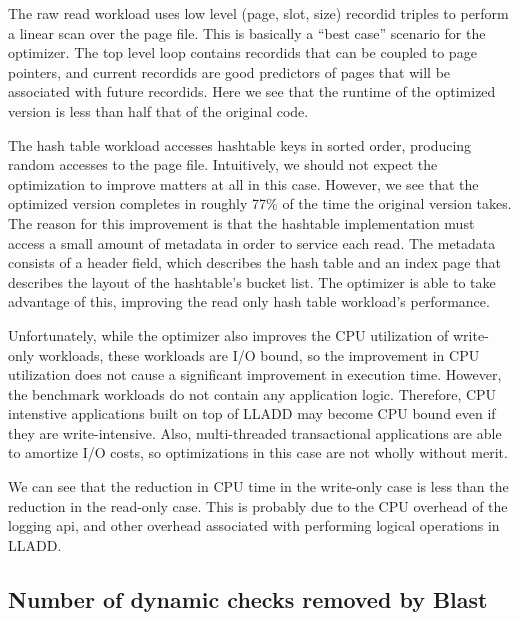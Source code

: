 \documentclass[10pt,letterpaper,twocolumn,english]{article}
\newcommand{\yad}{LLADD\xspace}
\begin{document}
The raw read workload uses low level (page, slot, size) recordid
triples to perform a linear scan over the page file.  This is
basically a ``best case'' scenario for the optimizer.  The top level
loop contains recordids that can be coupled to page pointers, and
current recordids are good predictors of pages that will be associated
with future recordids.  Here we see that the runtime of the optimized
version is less than half that of the original code.

The hash table workload accesses hashtable keys in sorted order,
producing random accesses to the page file.  Intuitively, we should not
expect the optimization to improve matters at all in this case.
However, we see that the optimized version completes in roughly 77\%
of the time the original version takes.  The reason for this
improvement is that the hashtable implementation must access a small
amount of metadata in order to service each read.  The metadata
consists of a header field, which describes the hash table and an
index page that describes the layout of the hashtable's bucket list.
The optimizer is able to take advantage of this, improving the
read only hash table workload's performance.

Unfortunately, while the optimizer also improves the CPU utilization of
write-only workloads, these workloads are I/O bound, so the
improvement in CPU utilization does not cause a significant improvement
in execution time.  However, the benchmark workloads do not contain
any application logic.  Therefore, CPU intenstive applications built
on top of \yad may become CPU bound even if they are write-intensive.  Also,
multi-threaded transactional applications are able to amortize I/O
costs, so optimizations in this case are not wholly without merit.

We can see that the reduction in CPU time in the write-only case is
less than the reduction in the read-only case.  This is probably due
to the CPU overhead of the logging api, and other overhead associated
with performing logical operations in \yad. 



\subsection{Number of dynamic checks removed by Blast}
\end{document}
